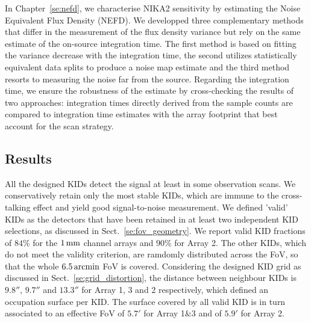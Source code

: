 In Chapter~\ref{se:nefd}, we characterise NIKA2 sensitivity by
estimating the Noise Equivalent Flux Density (NEFD). We developped
three complementary methods that differ in the measurement of the flux
density variance but rely on the
same estimate of the on-source integration time. The first method is
based on fitting the variance decrease with the integration time, the
second utilizes statistically equivalent data splits to produce a
noise map estimate and the third method resorts to measuring the noise
far from the source. Regarding the integration time, we ensure the
robustness of the estimate by cross-checking the results of two
approaches: integration times directly derived from the sample counts
are compared to integration time estimates with the array footprint
that best account for the scan strategy.  


\subsection*{Results}

All the designed KIDs detect the signal at least in some observation
scans. We conservatively retain only the most stable KIDs, which are
immune to the cross-talking effect and yield good signal-to-noise
measurement. We defined 'valid' KIDs as the detectors that have been
retained in at least two independent KID selections, as discussed in
Sect.~\ref{se:fov_geometry}. We report valid KID fractions of $84\%$
for the $1\,\rm{mm}$ channel arrays and $90\%$ for Array 2. The other
KIDs, which do not meet the validity criterion, are ramdomly
distributed across the FoV, so that the whole $6.5\,\rm{arcmin}$ FoV is
covered. Considering the designed KID grid as discussed in
Sect.~\ref{se:grid_distortion}, the distance between
neighbour KIDs is $9.8''$, $9.7''$ and $13.3''$ for Array 1, 3 and 2
respectively, which defined an occupation surface per KID. The surface
covered by all valid KID is in turn associated to an effective FoV of
$5.7'$ for Array 1$\&$3 and of $5.9'$ for Array 2.       

